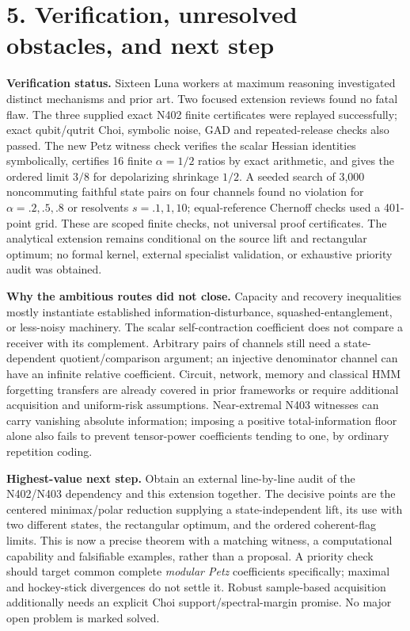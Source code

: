 \documentclass[10pt,a4paper]{article}
\begin{document}
\section*{5. Verification, unresolved obstacles, and next step}

\textbf{Verification status.} Sixteen Luna workers at maximum reasoning investigated distinct mechanisms and prior art. Two focused extension reviews found no fatal flaw. The three supplied exact N402 finite certificates were replayed successfully; exact qubit/qutrit Choi, symbolic noise, GAD and repeated-release checks also passed. The new Petz witness check verifies the scalar Hessian identities symbolically, certifies 16 finite $\alpha=1/2$ ratios by exact arithmetic, and gives the ordered limit $3/8$ for depolarizing shrinkage $1/2$. A seeded search of 3,000 noncommuting faithful state pairs on four channels found no violation for $\alpha=.2,.5,.8$ or resolvents $s=.1,1,10$; equal-reference Chernoff checks used a 401-point grid. These are scoped finite checks, not universal proof certificates. The analytical extension remains conditional on the source lift and rectangular optimum; no formal kernel, external specialist validation, or exhaustive priority audit was obtained.

\textbf{Why the ambitious routes did not close.} Capacity and recovery inequalities mostly instantiate established information-disturbance, squashed-entanglement, or less-noisy machinery. The scalar self-contraction coefficient does not compare a receiver with its complement. Arbitrary pairs of channels still need a state-dependent quotient/comparison argument; an injective denominator channel can have an infinite relative coefficient. Circuit, network, memory and classical HMM forgetting transfers are already covered in prior frameworks or require additional acquisition and uniform-risk assumptions. Near-extremal N403 witnesses can carry vanishing absolute information; imposing a positive total-information floor alone also fails to prevent tensor-power coefficients tending to one, by ordinary repetition coding.

\textbf{Highest-value next step.} Obtain an external line-by-line audit of the N402/N403 dependency and this extension together. The decisive points are the centered minimax/polar reduction supplying a state-independent lift, its use with two different states, the rectangular optimum, and the ordered coherent-flag limits. This is now a precise theorem with a matching witness, a computational capability and falsifiable examples, rather than a proposal. A priority check should target common complete \emph{modular Petz} coefficients specifically; maximal and hockey-stick divergences do not settle it. Robust sample-based acquisition additionally needs an explicit Choi support/spectral-margin promise. No major open problem is marked solved.
\end{document}
